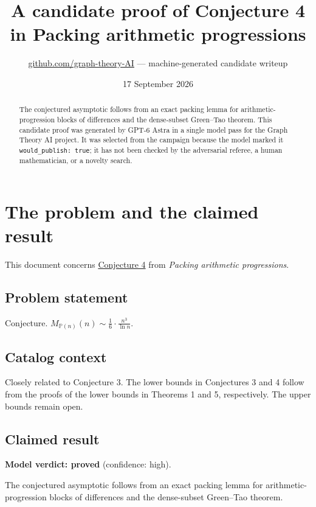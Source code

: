 \documentclass[
  11pt,
  a4paper,
]{article}
\title{A candidate proof of Conjecture 4 in Packing arithmetic
progressions}
\author{\href{https://github.com/graph-theory-AI}{github.com/graph-theory-AI}
--- machine-generated candidate writeup}
\date{17 September 2026}
\begin{document}
\maketitle
\begin{abstract}
The conjectured asymptotic follows from an exact packing lemma for
arithmetic-progression blocks of differences and the dense-subset
Green--Tao theorem. This candidate proof was generated by GPT-6 Astra in
a single model pass for the Graph Theory AI project. It was selected
from the campaign because the model marked it
\texttt{would\_publish:\ true}; it has not been checked by the
adversarial referee, a human mathematician, or a novelty search.
\end{abstract}

\section{The problem and the claimed
result}\label{the-problem-and-the-claimed-result}

This document concerns
\href{https://graph-theory-ai.github.io/graph-conjectures/arxiv/2603.02786__01/}{Conjecture
4} from \emph{Packing arithmetic progressions}.

\subsection{Problem statement}\label{problem-statement}

Conjecture.
\(M_{\mathbb{P}(n)}(n)\sim\frac{1}{6}\cdot\frac{n^{3}}{\ln n}\).

\subsection{Catalog context}\label{catalog-context}

Closely related to Conjecture 3. The lower bounds in Conjectures 3 and 4
follow from the proofs of the lower bounds in Theorems 1 and 5,
respectively. The upper bounds remain open.

\subsection{Claimed result}\label{claimed-result}

\textbf{Model verdict: proved} (confidence: high).

The conjectured asymptotic follows from an exact packing lemma for
arithmetic-progression blocks of differences and the dense-subset
Green--Tao theorem.
\end{document}
